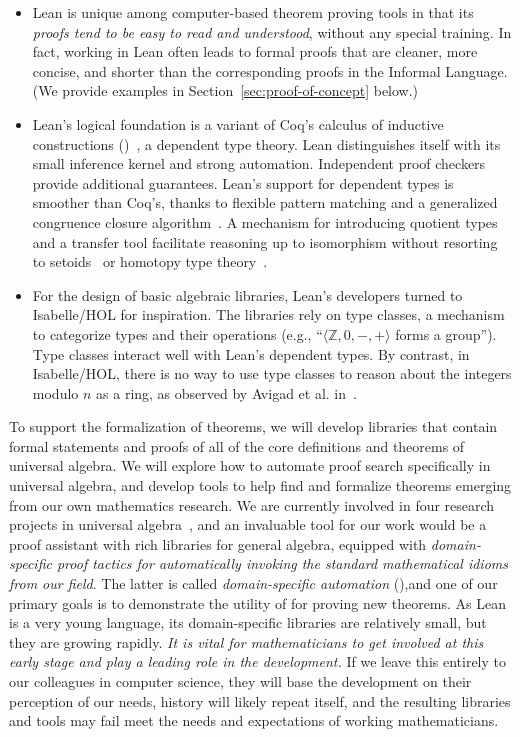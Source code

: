 \documentclass[11pt]{amsart}  %
\begin{document}
\begin{itemize}
  \item Lean is unique among computer-based theorem proving tools in that its \emph{proofs tend to be easy to read and understood}, without any special training.  In fact, working in Lean often leads to formal proofs that are cleaner, more concise, and shorter than the corresponding proofs in the Informal Language. (We provide examples in Section~\ref{sec:proof-of-concept} below.) 
  \item Lean's logical foundation is a variant of Coq's calculus of inductive constructions (\cic)~\cite{MR935892}, a dependent type theory. Lean distinguishes itself with its small inference kernel and strong automation. Independent proof checkers provide additional guarantees. Lean's support for dependent types is smoother than Coq's, thanks to flexible pattern matching and a generalized congruence closure algorithm~\cite{MR3536762}. A mechanism for introducing quotient types and a transfer tool facilitate reasoning up to isomorphism without resorting to setoids~\cite{MR1985376} or homotopy type theory~\cite{MR2962717}.
  \item For the design of basic algebraic libraries, Lean's developers turned to Isabelle/HOL for inspiration. The libraries rely on type classes, a mechanism to categorize types and their operations (e.g., ``$\langle \mathbb Z, 0, -, +\rangle$ forms a group''). Type classes interact well with Lean's dependent types. By contrast, in Isabelle/HOL, there is no way to use type classes to reason about the integers modulo $n$ as a ring, as observed by Avigad et al. in~\cite[Section 3.1]{MR3718212}. 
\end{itemize}




To support the formalization of theorems, we will develop libraries that contain formal statements and proofs of all of the core definitions and theorems of universal algebra. We will explore how to automate proof search specifically in universal algebra, and develop tools to help find and formalize theorems emerging from our own mathematics research. We are currently involved in four research projects in universal algebra~\cite{Bergman-DeMeo:2016,fin-lat-rep,DFV:2018,fg-free-lat}, and an invaluable tool for our work would be a proof assistant with rich libraries for general algebra, equipped with \emph{domain-specific proof tactics for automatically invoking the standard mathematical idioms from our field}. The latter is called \emph{domain-specific automation} (\dsa),and one of our primary goals is to demonstrate the utility of \dsa for proving new theorems.
As Lean is a very young language, its domain-specific libraries are relatively small, but they are growing rapidly. \emph{It is vital for mathematicians to get involved at this early stage and play a leading role in the development.}  If we leave this entirely to our colleagues in computer science, they will base the development on their perception of our needs, history will likely repeat itself, and the resulting libraries and tools may fail meet the needs and expectations of working mathematicians.
\end{document}
